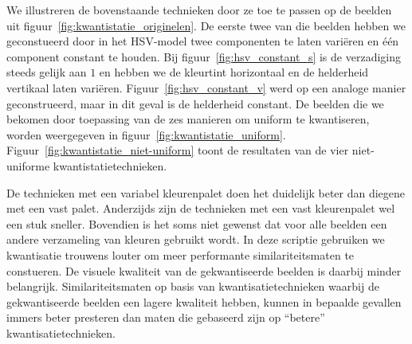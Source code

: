 We illustreren de bovenstaande technieken door ze toe te passen op de beelden uit 
figuur~\ref{fig:kwantistatie_originelen}. De eerste twee van die beelden hebben we geconstueerd
door in het HSV-model twee componenten te laten vari\"eren en \'e\'en component constant te houden.
Bij figuur~\ref{fig:hsv_constant_s} is de verzadiging steeds gelijk aan $1$ en hebben we de kleurtint 
horizontaal en de helderheid vertikaal laten vari\"eren. Figuur~\ref{fig:hsv_constant_v} werd 
op een analoge manier geconstrueerd, maar in dit geval is de helderheid constant.
De beelden die we bekomen door toepassing van de zes manieren om uniform te kwantiseren,
worden weergegeven in figuur~\ref{fig:kwantistatie_uniform}. Figuur~\ref{fig:kwantistatie_niet-uniform}
toont de resultaten van de vier niet-uniforme kwantistatietechnieken.

De technieken met een variabel kleurenpalet doen het duidelijk beter dan diegene met een vast palet. 
Anderzijds zijn de technieken met een vast kleurenpalet wel een stuk sneller. Bovendien is het soms niet
gewenst dat voor alle beelden een andere verzameling van kleuren gebruikt wordt. In deze scriptie gebruiken
we kwantisatie trouwens louter om meer performante similariteitsmaten te constueren. De visuele kwaliteit
van de gekwantiseerde beelden is daarbij minder belangrijk. Similariteitsmaten op basis van kwantisatietechnieken 
waarbij de gekwantiseerde beelden een lagere kwaliteit hebben, kunnen in bepaalde gevallen immers beter 
presteren dan maten die gebaseerd zijn op ``betere'' kwantisatietechnieken.

